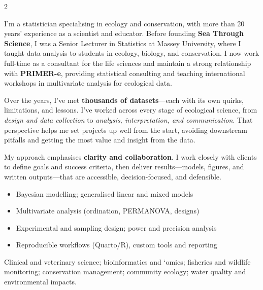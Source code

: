 \documentclass[
  11pt,
  letterpaper,
  DIV=11,
  numbers=noendperiod]{scrartcl}
\begin{document}
\begin{paracol}{2}
\setlength{\columnsep}{10mm}


I’m a statistician specialising in ecology and conservation, with more than 20 years’ experience as a scientist and educator. Before founding \textbf{Sea Through Science}, I was a Senior Lecturer in Statistics at Massey University, where I taught data analysis to students in ecology, biology, and conservation. I now work full-time as a consultant for the life sciences and maintain a strong relationship with \textbf{PRIMER-e}, providing statistical consulting and teaching international workshops in multivariate analysis for ecological data.

\medskip

Over the years, I’ve met \textbf{thousands of datasets}—each with its own quirks, limitations, and lessons. I’ve worked across every stage of ecological science, from \textit{design and data collection} to \textit{analysis, interpretation, and communication}. That perspective helps me set projects up well from the start, avoiding downstream pitfalls and getting the most value and insight from the data.

\medskip

My approach emphasises \textbf{clarity and collaboration}. I work closely with clients to define goals and success criteria, then deliver results—models, figures, and written outputs—that are accessible, decision-focused, and defensible.

\begin{itemize}
  \item Bayesian modelling; generalised linear and mixed models
  \item Multivariate analysis (ordination, PERMANOVA, designs)
  \item Experimental and sampling design; power and precision analysis
  \item Reproducible workflows (Quarto/R), custom tools and reporting
\end{itemize}

Clinical and veterinary science; bioinformatics and ‘omics; fisheries and wildlife monitoring; conservation management; community ecology; water quality and environmental impacts.

\switchcolumn


\end{paracol}
\end{document}
